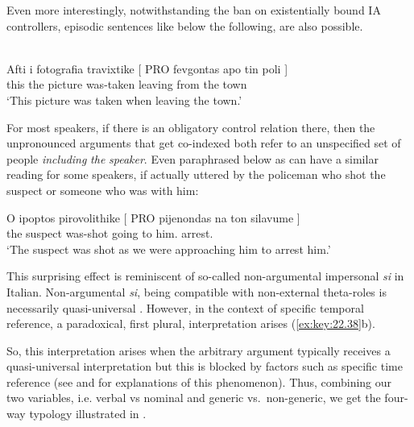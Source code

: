 \documentclass[output=paper]{langsci/langscibook}
\begin{document}
Even more interestingly, notwithstanding the ban on existentially bound IA
controllers, episodic sentences like  below the following, are
also possible.

\ea%
    \label{ex:key:22.36} \\
    \gll    Afti  i   fotografia travixtike [ PRO fevgontas apo    tin  poli ] \\
            this the     picture      was-taken {} {}    leaving     from  the town\\
    \glt    \enquote*{This picture was taken when leaving the town.}
\z

For most speakers, if there is an obligatory control relation there, then the
unpronounced arguments that get co-indexed both refer to an unspecified set of
people \emph{including} \emph{the} \emph{speaker}.   Even 
paraphrased below as  can have a similar reading for some
speakers, if actually uttered by the policeman who shot the suspect or someone
who was with him:

\ea%
\label{ex:key:22.37}
    \gll    \llap{\%}O    ipoptos   pirovolithike   [ PRO pijenondas   na   ton silavume ]\\
            the suspect  was-shot {} {}      going    to  him.\Cl{} arrest.\Fpl{}\\
    \glt    \enquote*{The suspect was shot as we were approaching him to arrest him.}
\z

This surprising effect is reminiscent of so-called non-argumental impersonal
\emph{si} in Italian. Non-argumental \emph{si}, being compatible with
non-external theta-roles is necessarily quasi-universal \citep{Cinque:1988}.
However, in the context of specific temporal reference, a paradoxical,
first plural, interpretation arises (\ref{ex:key:22.38}b).

\ea%
    \label{ex:key:22.38}
    \z
\z

So, this \Fpl{} interpretation arises when the arbitrary argument typically
receives a quasi-universal interpretation but this is blocked by factors such
as specific time reference (see \citealt{Cinque:1988} and \citealt{Roberts2014b}
for explanations of this phenomenon). Thus, combining our two variables, i.e.
verbal vs nominal  and generic vs.\ non-generic, we get the four-way
typology illustrated in .
\end{document}

